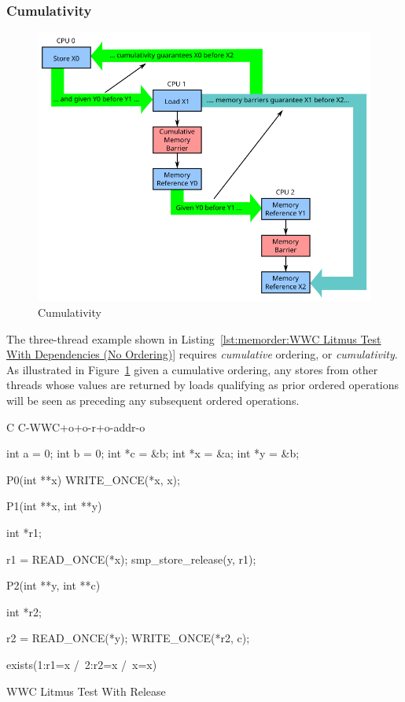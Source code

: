\subsubsection{Cumulativity}
\label{sec:memorder:Cumulativity}

\begin{figure}[htbp]
\centering
\includegraphics{memorder/memorybarriercum}
\caption{Cumulativity}
\label{fig:memorder:Cumulativity}
\end{figure}

The three-thread example shown in
Listing~\ref{lst:memorder:WWC Litmus Test With Dependencies (No Ordering)}
requires \emph{cumulative} ordering, or \emph{cumulativity}.
As illustrated in
Figure~\ref{fig:memorder:Cumulativity}
given a cumulative ordering, any stores
from other threads whose values are returned by loads qualifying as
prior ordered operations will be seen as preceding any subsequent
ordered operations.

\begin{listing}[tbp]
{ \scriptsize
\begin{verbbox}[\LstLineNo]
C C-WWC+o+o-r+o-addr-o

{
int a = 0;
int b = 0;
int *c = &b;
int *x = &a;
int *y = &b;
}

P0(int **x)
{
  WRITE_ONCE(*x, x);
}

P1(int **x, int **y)
{
  int *r1;

  r1 = READ_ONCE(*x);
  smp_store_release(y, r1);
}

P2(int **y, int **c)
{
  int *r2;

  r2 = READ_ONCE(*y);
  WRITE_ONCE(*r2, c);
}

exists(1:r1=x /\ 2:r2=x /\ x=x)
\end{verbbox}
}
\centering
\theverbbox
\caption{WWC Litmus Test With Release}
\label{lst:memorder:WWC Litmus Test With Release}
\end{listing}

